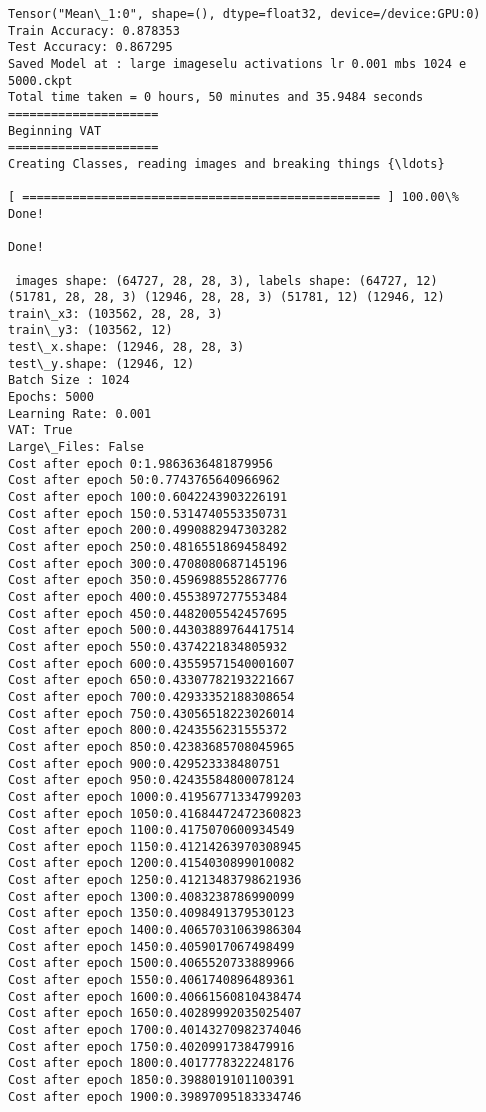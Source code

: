 \documentclass[11pt]{article}
\begin{document}
    \begin{Verbatim}[commandchars=\\\{\}]
Tensor("Mean\_1:0", shape=(), dtype=float32, device=/device:GPU:0)
Train Accuracy: 0.878353
Test Accuracy: 0.867295
Saved Model at : large imageselu activations lr 0.001 mbs 1024 e 5000.ckpt
Total time taken = 0 hours, 50 minutes and 35.9484 seconds
=====================
Beginning VAT
=====================
Creating Classes, reading images and breaking things {\ldots}

[ ================================================== ] 100.00\%
Done!

Done!

 images shape: (64727, 28, 28, 3), labels shape: (64727, 12)
(51781, 28, 28, 3) (12946, 28, 28, 3) (51781, 12) (12946, 12)
train\_x3: (103562, 28, 28, 3)
train\_y3: (103562, 12)
test\_x.shape: (12946, 28, 28, 3)
test\_y.shape: (12946, 12)
Batch Size : 1024
Epochs: 5000
Learning Rate: 0.001
VAT: True
Large\_Files: False 
Cost after epoch 0:1.9863636481879956
Cost after epoch 50:0.7743765640966962
Cost after epoch 100:0.6042243903226191
Cost after epoch 150:0.5314740553350731
Cost after epoch 200:0.4990882947303282
Cost after epoch 250:0.4816551869458492
Cost after epoch 300:0.4708080687145196
Cost after epoch 350:0.4596988552867776
Cost after epoch 400:0.4553897277553484
Cost after epoch 450:0.4482005542457695
Cost after epoch 500:0.44303889764417514
Cost after epoch 550:0.4374221834805932
Cost after epoch 600:0.43559571540001607
Cost after epoch 650:0.43307782193221667
Cost after epoch 700:0.42933352188308654
Cost after epoch 750:0.43056518223026014
Cost after epoch 800:0.4243556231555372
Cost after epoch 850:0.42383685708045965
Cost after epoch 900:0.429523338480751
Cost after epoch 950:0.42435584800078124
Cost after epoch 1000:0.41956771334799203
Cost after epoch 1050:0.41684472472360823
Cost after epoch 1100:0.4175070600934549
Cost after epoch 1150:0.41214263970308945
Cost after epoch 1200:0.4154030899010082
Cost after epoch 1250:0.41213483798621936
Cost after epoch 1300:0.4083238786990099
Cost after epoch 1350:0.4098491379530123
Cost after epoch 1400:0.40657031063986304
Cost after epoch 1450:0.4059017067498499
Cost after epoch 1500:0.4065520733889966
Cost after epoch 1550:0.4061740896489361
Cost after epoch 1600:0.40661560810438474
Cost after epoch 1650:0.40289992035025407
Cost after epoch 1700:0.40143270982374046
Cost after epoch 1750:0.4020991738479916
Cost after epoch 1800:0.4017778322248176
Cost after epoch 1850:0.3988019101100391
Cost after epoch 1900:0.39897095183334746

\end{Verbatim}
\end{document}
